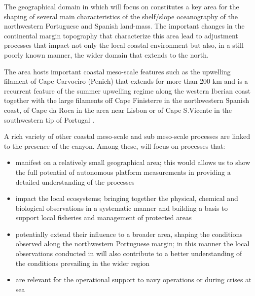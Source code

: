 The geographical domain in which \proj will focus on constitutes a key
area for the shaping of several main characteristics of the
shelf/slope oceanography of the northwestern Portuguese and Spanish
land-mass.  The important changes in the continental margin topography
that characterize this area lead to adjustment processes that impact
not only the local coastal environment but also, in a still poorly
known manner, the wider domain that extends to the north.


The area hosts important coastal meso-scale features such as the
upwelling filament of Cape Carvoeiro (Penich) that extends for more
than 200 km and is a recurrent feature of the summer upwelling regime
along the western Iberian coast together with the large filaments off
Cape Finisterre in the northwestern Spanish coast, of Cape da Roca in
the area near Lisbon or of Cape S.Vicente in the southwestern tip of
Portugal \cite{haynes93}.

A rich variety of other coastal meso-scale and sub meso-scale
processes are linked to the presence of the \naz canyon. Among these,
\proj will focus on processes that:

\begin{itemize}

\item manifest on a relatively small geographical area; this would
  allows us to show the full potential of autonomous platform
  measurements in providing a detailed understanding of the processes

\item impact the local ecosystems; bringing together the physical,
  chemical and biological observations in a systematic manner and
  building a basis to support local fisheries and management of
  protected areas

\item potentially extend their influence to a broader area, shaping
  the conditions observed along the northwestern Portuguese margin; in
  this manner the local observations conducted in \proj will also
  contribute to a better understanding of the conditions prevailing in
  the wider region

\item are relevant for the operational support to navy operations or
  during crises at sea

\end{itemize}  

